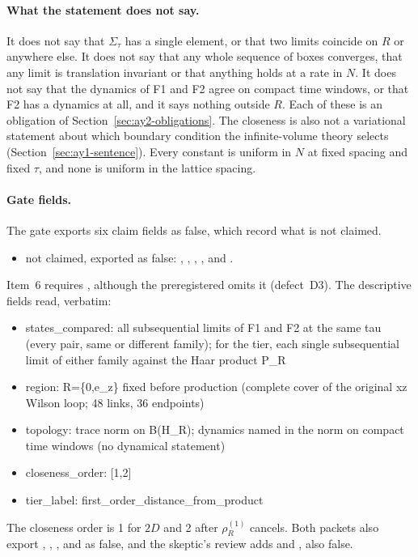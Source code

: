 \paragraph{What the statement does not say.}
It does not say that $\Sigma_\tau$ has a single element, or that two limits
coincide on $R$ or anywhere else. It does not say that any whole sequence of
boxes converges, that any limit is translation invariant or that anything
holds at a rate in $N$. It does not say that the dynamics of F1 and F2 agree
on compact time windows, or that F2 has a dynamics at all, and it says nothing
outside $R$. Each of these is an obligation of
Section~\ref{sec:ay2-obligations}. The closeness is also not a variational
statement about which boundary condition the infinite-volume theory selects
(Section~\ref{sec:ay1-sentence}). Every constant is uniform in $N$ at fixed
spacing and fixed $\tau$, and none is uniform in the lattice spacing.

\paragraph{Gate fields.}
The gate exports six claim fields as false, which record what is not
claimed.
\begin{itemize}\raggedright
\item not claimed, exported as false: ,
 , ,
 ,  and
 .
\end{itemize}
Item~6 requires
, although the preregistered
 omits it (defect~D3). The descriptive fields read,
verbatim:
\begin{gatequote}
\begin{itemize}
\item states\_compared: all subsequential limits of F1 and F2 at the same tau
(every pair, same or different family); for the tier, each single
subsequential limit of either family against the Haar product P\_R
\item region: R=\{0,e\_z\} fixed before production (complete cover of the
original xz Wilson loop; 48 links, 36 endpoints)
\item topology: trace norm on B(H\_R); dynamics named in the norm on compact
time windows (no dynamical statement)
\item closeness\_order: [1,2]
\item tier\_label: first\_order\_distance\_from\_product
\end{itemize}
\end{gatequote}
The closeness order is 1 for $2D$ and 2 after $\rho^{(1)}_R$ cancels. Both
packets also export , ,
,  and
 as false, and the skeptic's review adds
 and , also false.

